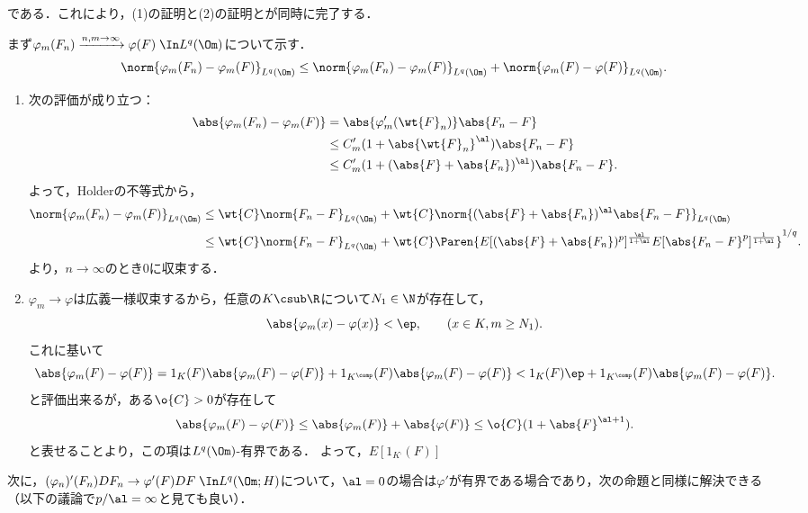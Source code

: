 \documentclass[uplatex,dvipdfmx]{jsreport}
\begin{document}
\begin{Proof}
\begin{enumerate}
\begin{enumerate}[{Step}1]
            である．これにより，(1)の証明と(2)の証明とが同時に完了する．
            \begin{Proof}[【証】]\renewcommand{\qedsymbol}{$\Box$}
                まず$\varphi_m(F_n)\xrightarrow{n,m\to\infty}\varphi(F)\;\In L^q(\Om)$について示す．
                \[\norm{\varphi_m(F_n)-\varphi_m(F)}_{L^q(\Om)}\le\norm{\varphi_m(F_n)-\varphi_m(F)}_{L^q(\Om)}+\norm{\varphi_m(F)-\varphi(F)}_{L^q(\Om)}.\]
                \begin{enumerate}[{第}1{項}]
                    \item 次の評価が成り立つ：
                    \begin{align*}
                        \abs{\varphi_m(F_n)-\varphi_m(F)}&=\abs{\varphi'_m(\wt{F}_n)}\abs{F_n-F}\\
                        &\le C_m'(1+\abs{\wt{F}_n}^\al)\abs{F_n-F}\\
                        &\le C_m'(1+(\abs{F}+\abs{F_n})^\al)\abs{F_n-F}.
                    \end{align*}
                    よって，Holderの不等式から，
                    \begin{align*}
                        \norm{\varphi_m(F_n)-\varphi_m(F)}_{L^q(\Om)}&\le \wt{C}\norm{F_n-F}_{L^q(\Om)}+\wt{C}\norm{(\abs{F}+\abs{F_n})^\al\abs{F_n-F}}_{L^q(\Om)}\\
                        &\le \wt{C}\norm{F_n-F}_{L^q(\Om)}+\wt{C}\Paren{E[(\abs{F}+\abs{F_n})^p]^{\frac{\al}{1+\al}}E[\abs{F_n-F}^p]^{\frac{1}{1+\al}}}^{1/q}.
                    \end{align*}
                    より，$n\to\infty$のとき$0$に収束する．
                    \item $\varphi_m\to\varphi$は広義一様収束するから，任意の$K\csub\R$について$N_1\in\N$が存在して，
                    \[\abs{\varphi_m(x)-\varphi(x)}<\ep,\qquad(x\in K,m\ge N_1).\]
                    これに基いて
                    \[\abs{\varphi_m(F)-\varphi(F)}=1_K(F)\abs{\varphi_m(F)-\varphi(F)}+1_{K^\comp}(F)\abs{\varphi_m(F)-\varphi(F)}<1_K(F)\ep+1_{K^\comp}(F)\abs{\varphi_m(F)-\varphi(F)}.\]
                    と評価出来るが，ある$\o{C}>0$が存在して
                    \[\abs{\varphi_m(F)-\varphi(F)}\le\abs{\varphi_m(F)}+\abs{\varphi(F)}\le\o{C}(1+\abs{F}^{\al+1}).\]
                    と表せることより，この項は$L^q(\Om)$-有界である．
                    よって，$E[1_{K^\comp}(F)]$
                \end{enumerate}
                次に，$(\varphi_n)'(F_n)DF_n\to\varphi'(F)DF\;\In L^q(\Om;H)$について，$\al=0$の場合は$\varphi'$が有界である場合であり，次の命題と同様に解決できる（以下の議論で$p/\al=\infty$と見ても良い）．

\end{Proof}
\end{enumerate}
\end{enumerate}
\end{Proof}
\end{document}
